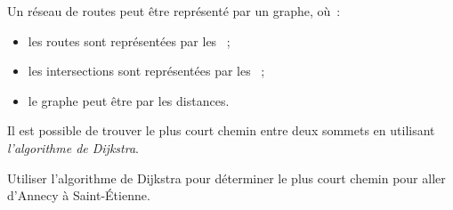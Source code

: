 \documentclass[12pt]{article}
\begin{document}
\begin{mdframed}
  Un réseau de routes peut être représenté par un graphe, où :
  \begin{itemize}
    \item les routes sont représentées par les  ;
    \item les intersections sont représentées par les  ;
    \item le graphe peut être  par les distances.
  \end{itemize}

  Il est possible de trouver le plus court chemin entre deux sommets en utilisant \emph{l'algorithme de Dijkstra}.
\end{mdframed}

\begin{exercice*}
  Utiliser l'algorithme de Dijkstra pour déterminer le plus court chemin pour aller d'Annecy à Saint-Étienne.
\end{exercice*}
\end{document}
